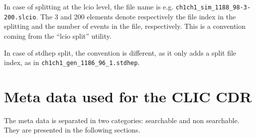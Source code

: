 \documentclass[11pt,a4paper]{scrartcl}
\begin{document}
In case of splitting at the lcio level, the file name is e.g.
\lstinline[language=bash]|ch1ch1_sim_1188_98-3-200.slcio|. The 3 and 200
elements denote respectively the file index in the splitting and the number of
events in the file, respectively. This is a convention coming from the ``lcio split'' utility. 

In case of stdhep split, the convention is different, as it only adds a split
file index, as in \lstinline[language=bash]|ch1ch1_gen_1186_96_1.stdhep|. 

\section{Meta data used for the CLIC CDR}
The meta data is separated in two categories: searchable and non searchable.
They are presented in the following sections.
\end{document}
